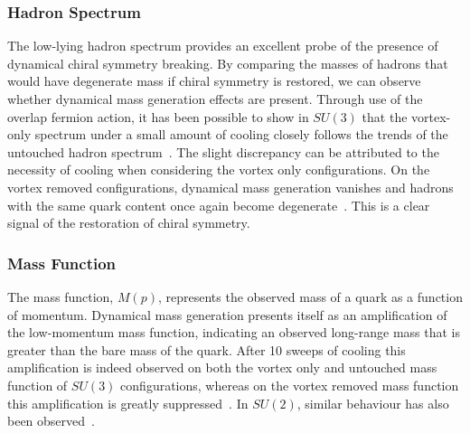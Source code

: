 \subsubsection{Hadron Spectrum}
The low-lying hadron spectrum provides an excellent probe of the presence of dynamical chiral symmetry breaking. By comparing the masses of hadrons that would have degenerate mass if chiral symmetry is restored, we can observe whether dynamical mass generation effects are present. Through use of the overlap fermion action, it has been possible to show in $SU(3)$ that the vortex-only spectrum under a small amount of cooling closely follows the trends of the untouched hadron spectrum~\cite{Trewartha:2017ive}. The slight discrepancy can be attributed to the necessity of cooling when considering the vortex only configurations. On the vortex removed configurations, dynamical mass generation vanishes and hadrons with the same quark content once again become degenerate~\cite{Trewartha:2017ive}. This is a clear signal of the restoration of chiral symmetry. 

\subsubsection{Mass Function}
The mass function, $M(p)$, represents the observed mass of a quark as a function of momentum. Dynamical mass generation presents itself as an amplification of the low-momentum mass function, indicating an observed long-range mass that is greater than the bare mass of the quark. After 10 sweeps of cooling this amplification is indeed observed on both the vortex only and untouched mass function of $SU(3)$ configurations, whereas on the vortex removed mass function this amplification is greatly suppressed~\cite{Trewartha:2015nna}. In $SU(2)$, similar behaviour has also been observed~\cite{Bowman:2008qd}.

